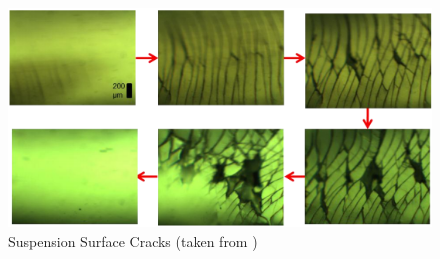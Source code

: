 \documentclass[twoside,a4]{report}
\begin{document}
	\begin{figure}[!htb]
		\centering
		\includegraphics[scale=0.45]{images/cfors_cracks.png}
		\caption{Suspension Surface Cracks (taken from \cite{thescforsyth})}
		\label{cforscracks}
	\end{figure}
\end{document}
